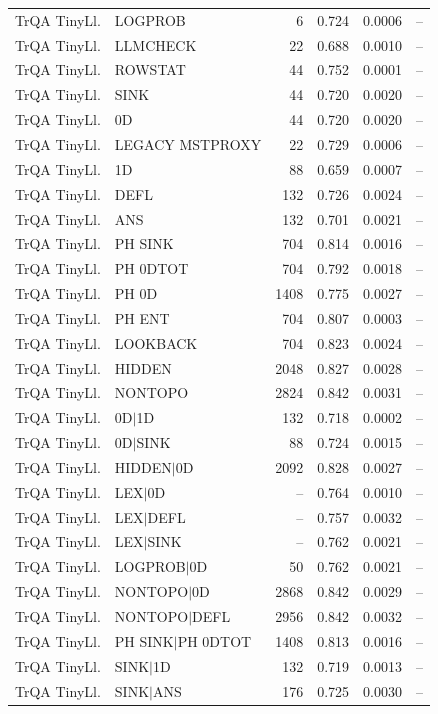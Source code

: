 \begin{longtable}{llrrrr}
TrQA TinyLl. & LOGPROB & 6 & 0.724 & 0.0006 & -- \\
TrQA TinyLl. & LLMCHECK & 22 & 0.688 & 0.0010 & -- \\
TrQA TinyLl. & ROWSTAT & 44 & 0.752 & 0.0001 & -- \\
TrQA TinyLl. & SINK & 44 & 0.720 & 0.0020 & -- \\
TrQA TinyLl. & 0D & 44 & 0.720 & 0.0020 & -- \\
TrQA TinyLl. & LEGACY MSTPROXY & 22 & 0.729 & 0.0006 & -- \\
TrQA TinyLl. & 1D & 88 & 0.659 & 0.0007 & -- \\
TrQA TinyLl. & DEFL & 132 & 0.726 & 0.0024 & -- \\
TrQA TinyLl. & ANS & 132 & 0.701 & 0.0021 & -- \\
TrQA TinyLl. & PH SINK & 704 & 0.814 & 0.0016 & -- \\
TrQA TinyLl. & PH 0DTOT & 704 & 0.792 & 0.0018 & -- \\
TrQA TinyLl. & PH 0D & 1408 & 0.775 & 0.0027 & -- \\
TrQA TinyLl. & PH ENT & 704 & 0.807 & 0.0003 & -- \\
TrQA TinyLl. & LOOKBACK & 704 & 0.823 & 0.0024 & -- \\
TrQA TinyLl. & HIDDEN & 2048 & 0.827 & 0.0028 & -- \\
TrQA TinyLl. & NONTOPO & 2824 & 0.842 & 0.0031 & -- \\
TrQA TinyLl. & 0D$\mid$1D & 132 & 0.718 & 0.0002 & -- \\
TrQA TinyLl. & 0D$\mid$SINK & 88 & 0.724 & 0.0015 & -- \\
TrQA TinyLl. & HIDDEN$\mid$0D & 2092 & 0.828 & 0.0027 & -- \\
TrQA TinyLl. & LEX$\mid$0D & -- & 0.764 & 0.0010 & -- \\
TrQA TinyLl. & LEX$\mid$DEFL & -- & 0.757 & 0.0032 & -- \\
TrQA TinyLl. & LEX$\mid$SINK & -- & 0.762 & 0.0021 & -- \\
TrQA TinyLl. & LOGPROB$\mid$0D & 50 & 0.762 & 0.0021 & -- \\
TrQA TinyLl. & NONTOPO$\mid$0D & 2868 & 0.842 & 0.0029 & -- \\
TrQA TinyLl. & NONTOPO$\mid$DEFL & 2956 & 0.842 & 0.0032 & -- \\
TrQA TinyLl. & PH SINK$\mid$PH 0DTOT & 1408 & 0.813 & 0.0016 & -- \\
TrQA TinyLl. & SINK$\mid$1D & 132 & 0.719 & 0.0013 & -- \\
TrQA TinyLl. & SINK$\mid$ANS & 176 & 0.725 & 0.0030 & -- \\

\end{longtable}
